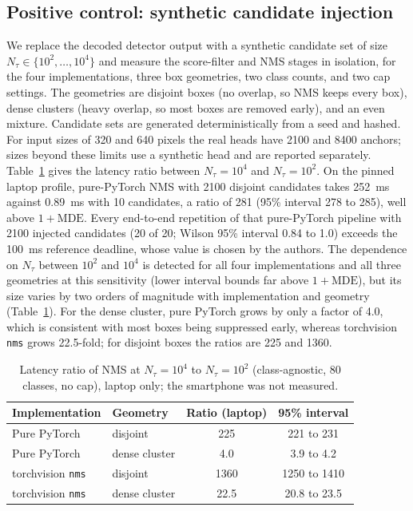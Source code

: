 \documentclass[a4paper,fleqn]{cas-dc}
\newcommand{\Ntau}{N_{\tau}}
\begin{document}
\subsection{Positive control: synthetic candidate injection}
We replace the decoded detector output with a synthetic candidate set of size $\Ntau\in\{10^2,\dots,10^4\}$ and measure the score-filter and NMS stages in isolation, for the four implementations, three box geometries, two class counts, and two cap settings. The geometries are disjoint boxes (no overlap, so NMS keeps every box), dense clusters (heavy overlap, so most boxes are removed early), and an even mixture. Candidate sets are generated deterministically from a seed and hashed. For input sizes of 320 and 640 pixels the real heads have 2100 and 8400 anchors; sizes beyond these limits use a synthetic head and are reported separately. Table~\ref{tab:dose} gives the latency ratio between $\Ntau=10^4$ and $\Ntau=10^2$.
On the pinned laptop profile, pure-PyTorch NMS with 2100 disjoint candidates takes 252~ms against 0.89~ms with 10 candidates, a ratio of 281 (95\% interval 278 to 285), well above $1+\mathrm{MDE}$. Every end-to-end repetition of that pure-PyTorch pipeline with 2100 injected candidates (20 of 20; Wilson 95\% interval 0.84 to 1.0) exceeds the 100~ms reference deadline, whose value is chosen by the authors. The dependence on $\Ntau$ between $10^2$ and $10^4$ is detected for all four implementations and all three geometries at this sensitivity (lower interval bounds far above $1+\mathrm{MDE}$), but its size varies by two orders of magnitude with implementation and geometry (Table~\ref{tab:dose}). For the dense cluster, pure PyTorch grows by only a factor of 4.0, which is consistent with most boxes being suppressed early, whereas torchvision \texttt{nms} grows 22.5-fold; for disjoint boxes the ratios are 225 and 1360.

\begin{table}[t]
\centering\small
\caption{Latency ratio of NMS at $\Ntau=10^4$ to $\Ntau=10^2$ (class-agnostic, 80 classes, no cap), laptop only; the smartphone was not measured.}
\label{tab:dose}
\begin{tabular}{@{}llcc@{}}
\toprule
Implementation & Geometry & Ratio (laptop) & 95\% interval \\
\midrule
Pure PyTorch & disjoint & 225 & 221 to 231 \\
Pure PyTorch & dense cluster & 4.0 & 3.9 to 4.2 \\
torchvision \texttt{nms} & disjoint & 1360 & 1250 to 1410 \\
torchvision \texttt{nms} & dense cluster & 22.5 & 20.8 to 23.5 \\
\bottomrule
\end{tabular}
\end{table}
\end{document}
